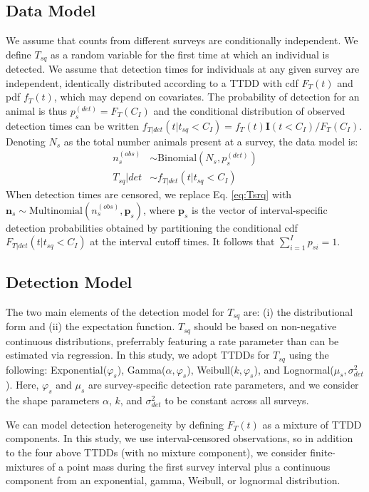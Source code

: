 \documentclass[useAMS,usenatbib,referee,12pt]{article}
\newcommand{\vn}{\textbf{n}}
\begin{document}
\subsection{Data Model}
We assume that counts from different surveys are conditionally independent.  
We define $T_{sq}$ as a random variable for the first time at which an individual is detected.
We assume that detection times for individuals at any given survey are independent, identically distributed according to a TTDD with cdf $F_T(t)$ and pdf $f_T(t)$, which may depend on covariates.  
The probability of detection for an animal is thus $p_{s}^{(det)} = F_T(C_I)$ and the conditional distribution of observed detection times can be written $f_{T|det}(t|t_{sq}<C_I) = f_T(t) \textbf{I}(t<C_I) / F_T(C_I)$.  
Denoting $N_{s}$ as the total number animals present at a survey, the data model is:
\begin{align}\label{eq:datamodel}
n_{s}^{(obs)} &\sim \mbox{Binomial}\left(N_{s}, p_{s}^{(det)}\right)\\
\label{eq:Tsrq}T_{sq}|det &\sim f_{T|det}(t|t_{sq}<C_I)
\end{align}
When detection times are censored, we replace Eq. \ref{eq:Tsrq} with $\vn_{s} \sim \mbox{Multinomial}\left(n_{s}^{(obs)}, \textbf{p}_{s}\right)$, where $\textbf{p}_{s}$ is the vector of interval-specific detection probabilities obtained by partitioning the conditional cdf $F_{T|det}(t|t_{sq}<C_I)$ at the interval cutoff times.  
It follows that $\sum_{i=1}^I p_{si} = 1$.



\subsection{Detection Model}\label{sec:detectionmodel}

The two main elements of the detection model for $T_{sq}$ are: (i) the distributional form and (ii) the expectation function.
$T_{sq}$ should be based on non-negative continuous distributions, preferrably featuring a rate parameter than can be estimated via regression.  
In this study, we adopt TTDDs for $T_{sq}$ using the following: Exponential($\varphi_{s}$), Gamma($\alpha, \varphi_{s}$), Weibull($k, \varphi_{s}$), and Lognormal($\mu_{s}, \sigma_{det}^2$).  
Here, $\varphi_{s}$ and $\mu_{s}$ are survey-specific detection rate parameters, and we consider the shape parameters $\alpha$, $k$, and $\sigma_{det}^2$ to be constant across all surveys.

We can model detection heterogeneity by defining $F_T(t)$ as a mixture of TTDD components.  
In this study, we use interval-censored observations, so in addition to the four above TTDDs (with no mixture component), we consider finite-mixtures of a point mass during the first survey interval plus a continuous component from an exponential, gamma, Weibull, or lognormal distribution.  
\end{document}
